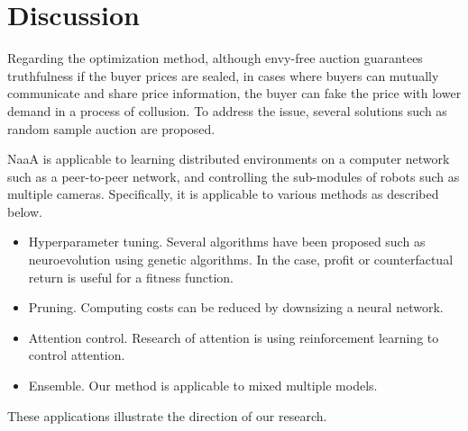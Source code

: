 \section{Discussion}

Regarding the optimization method,
although envy-free auction guarantees truthfulness if the buyer prices are sealed,
in cases where buyers can mutually communicate and share price information, 
the buyer can fake the price with lower demand in a process of collusion.
To address the issue, several solutions such as random sample auction \cite{goldberg2006competitive} are proposed.



NaaA is applicable to learning distributed environments on a computer network such as a peer-to-peer network, and controlling the sub-modules of robots such as multiple cameras.
Specifically, it is applicable to various methods as described below.
\begin{itemize}
\item Hyperparameter tuning. 
Several algorithms have been proposed such as neuroevolution using genetic algorithms.
In the case, profit or counterfactual return is useful for a fitness function.
\item Pruning. Computing costs can be reduced by downsizing a neural network.
\item Attention control. Research of attention is using reinforcement learning to control attention.
\item Ensemble. Our method is applicable to mixed multiple models.

\end{itemize}
These applications illustrate the direction of our research.
